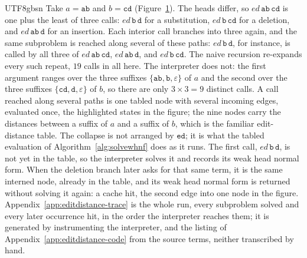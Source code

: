 \begin{CJK*}{UTF8}{gbsn}
  Take $a=\mathtt{ab}$ and $b=\mathtt{cd}$ (Figure~\ref{fig:editdistance}). The heads differ, so $\mathit{ed}\,\mathtt{ab}\,\mathtt{cd}$ is one plus the least of three calls: $\mathit{ed}\,\mathtt{b}\,\mathtt{d}$ for a substitution, $\mathit{ed}\,\mathtt{b}\,\mathtt{cd}$ for a deletion, and $\mathit{ed}\,\mathtt{ab}\,\mathtt{d}$ for an insertion. Each interior call branches into three again, and the same subproblem is reached along several of these paths: $\mathit{ed}\,\mathtt{b}\,\mathtt{d}$, for instance, is called by all three of $\mathit{ed}\,\mathtt{ab}\,\mathtt{cd}$, $\mathit{ed}\,\mathtt{ab}\,\mathtt{d}$, and $\mathit{ed}\,\mathtt{b}\,\mathtt{cd}$. The naive recursion re-expands every such repeat, $19$ calls in all here. The interpreter does not: the first argument ranges over the three suffixes $\{\mathtt{ab},\mathtt{b},\varepsilon\}$ of $a$ and the second over the three suffixes $\{\mathtt{cd},\mathtt{d},\varepsilon\}$ of $b$, so there are only $3\times 3=9$ distinct calls. A call reached along several paths is one tabled node with several incoming edges, evaluated once, the highlighted states in the figure; the nine nodes carry the distances between a suffix of $a$ and a suffix of $b$, which is the familiar edit-distance table. The collapse is not arranged by $\mathtt{ed}$; it is what the tabled evaluation of Algorithm~\ref{alg:solvewhnf} does as it runs. The first call, $\mathit{ed}\,\mathtt{b}\,\mathtt{d}$, is not yet in the table, so the interpreter solves it and records its weak head normal form. When the deletion branch later asks for that same term, it is the same interned node, already in the table, and its weak head normal form is returned without solving it again: a cache hit, the second edge into one node in the figure. Appendix~\ref{app:editdistance-trace} is the whole run, every subproblem solved and every later occurrence hit, in the order the interpreter reaches them; it is generated by instrumenting the interpreter, and the listing of Appendix~\ref{app:editdistance-code} from the source terms, neither transcribed by hand.
  \fi

  \begin{figure}
    \centering
    
    \caption{}
    \label{fig:editdistance}
  \end{figure}


\end{CJK*}
